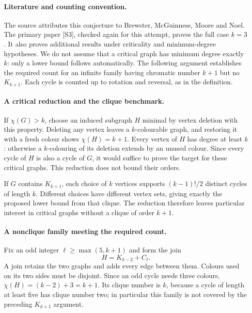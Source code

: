 \documentclass[11pt,a4paper]{article}
\begin{document}
\paragraph{Literature and counting convention.}
The source attributes this conjecture to Brewster, McGuinness, Moore and
Noel. The primary paper [S3], checked again for this attempt, proves the
full case $k=3$. It also proves additional results under criticality and
minimum-degree hypotheses. We do not assume that a critical graph has
minimum degree exactly $k$: only a lower bound follows automatically.
The following argument establishes the required count for an infinite
family having chromatic number $k+1$ but no $K_{k+1}$. Each cycle is
counted up to rotation and reversal, as in the definition.

\paragraph{A critical reduction and the clique benchmark.}
If $\chi(G)>k$, choose an induced subgraph $H$ minimal by vertex deletion
with this property. Deleting any vertex leaves a $k$-colourable graph,
and restoring it with a fresh colour shows $\chi(H)=k+1$.
Every vertex of $H$ has degree at least $k$: otherwise a $k$-colouring
of its deletion extends by an unused colour. Since every cycle of $H$
is also a cycle of $G$, it would suffice to prove the target for these
critical graphs. This reduction does not bound their orders.

If $G$ contains $K_{k+1}$, each choice of $k$ vertices supports
$(k-1)!/2$ distinct cycles of length $k$. Different choices have different
vertex sets, giving exactly the proposed lower bound from that clique.
The reduction therefore leaves particular interest in critical graphs
without a clique of order $k+1$.

\paragraph{A nonclique family meeting the required count.}
Fix an odd integer $\ell\ge\max(5,k+1)$ and form the join
\[
                 H=K_{k-2}+C_\ell.
\]
A join retains the two graphs and adds every edge between them. Colours
used on its two sides must be disjoint. Since an odd cycle needs three
colours, $\chi(H)=(k-2)+3=k+1$. Its clique number is $k$, because a
cycle of length at least five has clique number two; in particular this
family is not covered by the preceding $K_{k+1}$ argument.
\end{document}
